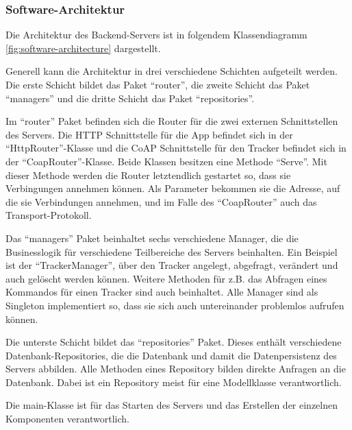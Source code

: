 \subsubsection{Software-Architektur}
\FloatBarrier
Die Architektur des Backend-Servers ist in folgendem Klassendiagramm \ref{fig:software-architecture} dargestellt.

Generell kann die Architektur in drei verschiedene Schichten aufgeteilt werden.
Die erste Schicht bildet das Paket \enquote{router}, die zweite Schicht das Paket \enquote{managers} und die dritte Schicht das Paket \enquote{repositories}.

Im \enquote{router} Paket befinden sich die Router für die zwei externen Schnittstellen des Servers.
Die \gls{HTTP} Schnittstelle für die App befindet sich in der \enquote{HttpRouter}-Klasse und die \gls{CoAP} Schnittstelle für den Tracker befindet sich in der \enquote{CoapRouter}-Klasse.
Beide Klassen besitzen eine Methode \enquote{Serve}.
Mit dieser Methode werden die Router letztendlich gestartet so, dass sie Verbingungen annehmen können.
Als Parameter bekommen sie die Adresse, auf die sie Verbindungen annehmen, und im Falle des \enquote{CoapRouter} auch das Transport-Protokoll.

Das \enquote{managers} Paket beinhaltet sechs verschiedene Manager, die die Businesslogik für verschiedene Teilbereiche des Servers beinhalten.
Ein Beispiel ist der \enquote{TrackerManager}, über den Tracker angelegt, abgefragt, verändert und auch gelöscht werden können.
Weitere Methoden für z.B. das Abfragen eines Kommandos für einen Tracker sind auch beinhaltet.
Alle Manager sind als Singleton implementiert so, dass sie sich auch untereinander problemlos aufrufen können.

Die unterste Schicht bildet das \enquote{repositories} Paket.
Dieses enthält verschiedene Datenbank-Repositories, die die Datenbank und damit die Datenpersistenz des Servers abbilden.
Alle Methoden eines Repository bilden direkte Anfragen an die Datenbank.
Dabei ist ein Repository meist für eine Modellklasse verantwortlich.

Die main-Klasse ist für das Starten des Servers und das Erstellen der einzelnen Komponenten verantwortlich.

